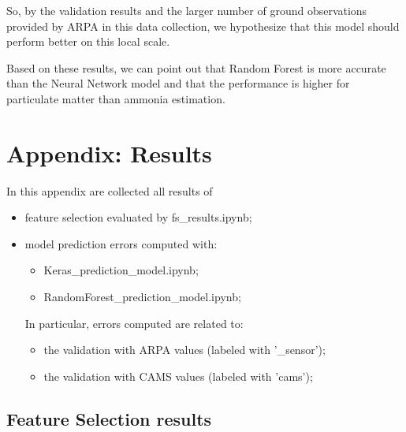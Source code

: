 So, by the validation results and the larger number of ground observations provided by ARPA in this data collection, we hypothesize that this model should perform better on this local scale.
\par
Based on these results, we can point out that Random Forest is more accurate than the  Neural Network model and that the performance is higher for particulate matter than ammonia estimation.\\

\chapter{Appendix: Results}
\label{chap:appendix}
In this appendix are collected all results of
\begin{itemize}
    \item feature selection evaluated by fs\_results.ipynb;
    \item model prediction errors computed with:
    \begin{itemize}
        \item Keras\_prediction\_model.ipynb;
        \item RandomForest\_prediction\_model.ipynb;
    \end{itemize} 
    In particular, errors computed are related to:
    \begin{itemize}
        \item the validation with ARPA values (labeled with '\_sensor');
        \item the validation with CAMS values (labeled with '\-cams');
    \end{itemize}
\end{itemize}
\section{Feature Selection results}
